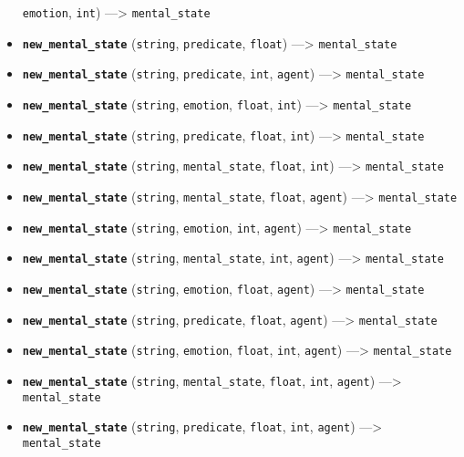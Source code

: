 \documentclass[]{book}
\theoremstyle{definition}
\theoremstyle{definition}
\theoremstyle{definition}
\theoremstyle{remark}
\begin{document}
\begin{itemize}
  \texttt{emotion}, \texttt{int}) ---\textgreater{}
  \texttt{mental\_state}
\item
  \textbf{\texttt{new\_mental\_state}} (\texttt{string},
  \texttt{predicate}, \texttt{float}) ---\textgreater{}
  \texttt{mental\_state}
\item
  \textbf{\texttt{new\_mental\_state}} (\texttt{string},
  \texttt{predicate}, \texttt{int}, \texttt{agent}) ---\textgreater{}
  \texttt{mental\_state}
\item
  \textbf{\texttt{new\_mental\_state}} (\texttt{string},
  \texttt{emotion}, \texttt{float}, \texttt{int}) ---\textgreater{}
  \texttt{mental\_state}
\item
  \textbf{\texttt{new\_mental\_state}} (\texttt{string},
  \texttt{predicate}, \texttt{float}, \texttt{int}) ---\textgreater{}
  \texttt{mental\_state}
\item
  \textbf{\texttt{new\_mental\_state}} (\texttt{string},
  \texttt{mental\_state}, \texttt{float}, \texttt{int})
  ---\textgreater{} \texttt{mental\_state}
\item
  \textbf{\texttt{new\_mental\_state}} (\texttt{string},
  \texttt{mental\_state}, \texttt{float}, \texttt{agent})
  ---\textgreater{} \texttt{mental\_state}
\item
  \textbf{\texttt{new\_mental\_state}} (\texttt{string},
  \texttt{emotion}, \texttt{int}, \texttt{agent}) ---\textgreater{}
  \texttt{mental\_state}
\item
  \textbf{\texttt{new\_mental\_state}} (\texttt{string},
  \texttt{mental\_state}, \texttt{int}, \texttt{agent})
  ---\textgreater{} \texttt{mental\_state}
\item
  \textbf{\texttt{new\_mental\_state}} (\texttt{string},
  \texttt{emotion}, \texttt{float}, \texttt{agent}) ---\textgreater{}
  \texttt{mental\_state}
\item
  \textbf{\texttt{new\_mental\_state}} (\texttt{string},
  \texttt{predicate}, \texttt{float}, \texttt{agent}) ---\textgreater{}
  \texttt{mental\_state}
\item
  \textbf{\texttt{new\_mental\_state}} (\texttt{string},
  \texttt{emotion}, \texttt{float}, \texttt{int}, \texttt{agent})
  ---\textgreater{} \texttt{mental\_state}
\item
  \textbf{\texttt{new\_mental\_state}} (\texttt{string},
  \texttt{mental\_state}, \texttt{float}, \texttt{int}, \texttt{agent})
  ---\textgreater{} \texttt{mental\_state}
\item
  \textbf{\texttt{new\_mental\_state}} (\texttt{string},
  \texttt{predicate}, \texttt{float}, \texttt{int}, \texttt{agent})
  ---\textgreater{} \texttt{mental\_state}
\end{itemize}
\end{document}

